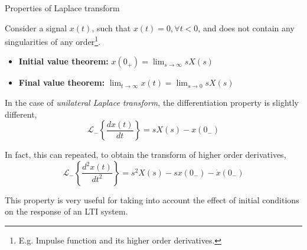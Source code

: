 \documentclass{beamer}
\begin{document}
\begin{frame}{Properties of Laplace transform}

Consider a signal $x(t)$, such that $x(t) = 0, \forall t < 0$, and does not contain any singularities of any order\footnote{E.g. Impulse function and its higher order derivatives.}.
\begin{itemize}
\item \textbf{Initial value theorem:} $x\left(0_{+}\right) = \lim_{s \to \infty}sX(s)$
\item \textbf{Final value theorem:} $\lim_{t \to \infty}x\left(t\right) = \lim_{s \to 0}sX(s)$
\end{itemize}

In the case of \textit{unilateral Laplace transform}, the differentiation property is slightly different,
\vspace{-3mm}
\[ \mathcal{L_{-}}\left\lbrace \frac{dx(t)}{dt}\right\rbrace = sX(s) - x(0_{-}) \]

In fact, this can repeated, to obtain the transform of higher order derivatives,
\vspace{-3mm} 
\[ \mathcal{L_{-}}\left\lbrace \frac{d^2x(t)}{dt^2}\right\rbrace = s^2X(s) - sx(0_{-}) - \dot{x}(0_{-}) \]

This property is very useful for taking into account the effect of initial conditions on the response of an LTI system.
\end{frame}
\end{document}

